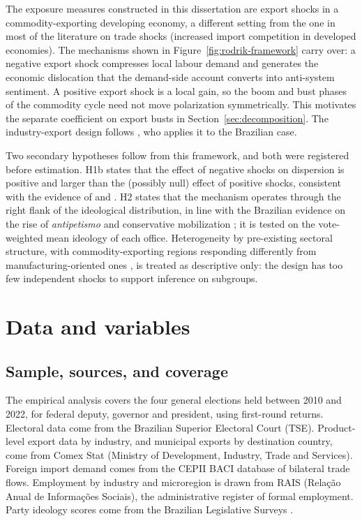 \documentclass[
	11pt,				%
	oneside,			%
	a4paper,			%
	english,			%
	english				%
	]{abntex2ppgsi}
\theoremstyle{plain}
\theoremstyle{remark}
\theoremstyle{plain}%
\theoremstyle{remark}%
\begin{document}
The exposure measures constructed in this dissertation are export shocks in a commodity-exporting developing economy, a different setting from the one in most of the literature on trade shocks (increased import competition in developed economies). The mechanisms shown in Figure~\ref{fig:rodrik-framework} carry over: a negative export shock compresses local labour demand and generates the economic dislocation that the demand-side account converts into anti-system sentiment. A positive export shock is a local gain, so the boom and bust phases of the commodity cycle need not move polarization symmetrically. This motivates the separate coefficient on export busts in Section~\ref{sec:decomposition}. The industry-export design follows , who applies it to the Brazilian case.

Two secondary hypotheses follow from this framework, and both were registered before estimation. H1b states that the effect of negative shocks on dispersion is positive and larger than the (possibly null) effect of positive shocks, consistent with the evidence of  and . H2 states that the mechanism operates through the right flank of the ideological distribution, in line with the Brazilian evidence on the rise of \emph{antipetismo} and conservative mobilization \cite{status,samuelszucco2018}; it is tested on the vote-weighted mean ideology of each office. Heterogeneity by pre-existing sectoral structure, with commodity-exporting regions responding differently from manufacturing-oriented ones \cite{ferraz2014,oecd2022brazil}, is treated as descriptive only: the design has too few independent shocks to support inference on subgroups.



\chapter{Data and variables}
\label{ch:data-variables}

\section{Sample, sources, and coverage}

The empirical analysis covers the four general elections held between 2010 and 2022, for federal deputy, governor and president, using first-round returns. Electoral data come from the Brazilian Superior Electoral Court (TSE). Product-level export data by industry, and municipal exports by destination country, come from Comex Stat (Ministry of Development, Industry, Trade and Services). Foreign import demand comes from the CEPII BACI database of bilateral trade flows. Employment by industry and microregion is drawn from RAIS (Relação Anual de Informações Sociais), the administrative register of formal employment. Party ideology scores come from the Brazilian Legislative Surveys \cite{ZUCCO}.
\end{document}

